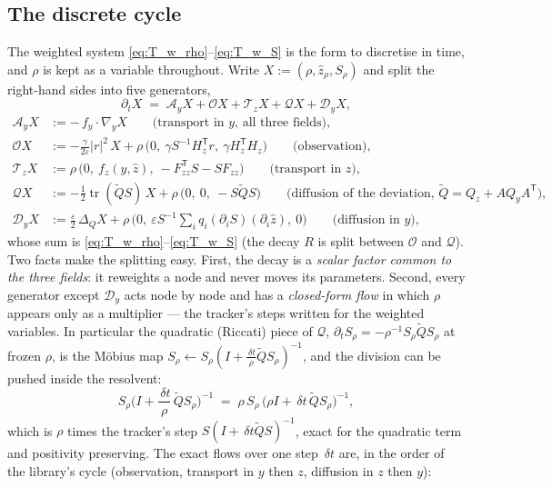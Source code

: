 \documentclass[11pt,a4paper]{article}
\newcommand{\tr}{\operatorname{tr}}
\newcommand{\T}{^{\mathsf T}}
\newcommand{\zh}{\hat{z}}
\newcommand{\zr}{\hat{z}_{\rho}}   %
\newcommand{\Sr}{S_{\rho}}          %
\newcommand{\eps}{\varepsilon}
\newcommand{\abs}[1]{\left\lvert #1 \right\rvert}
\newcommand{\gy}{\nabla_{\!y}}
\newcommand{\dt}{\,\delta t}
\theoremstyle{plain}
\theoremstyle{definition}
\theoremstyle{remark}
\begin{document}
\subsection{The discrete cycle}
\label{sec:cycle_main}

The weighted system \eqref{eq:T_w_rho}--\eqref{eq:T_w_S} is the form to discretise in time, and $\rho$ is kept as a variable throughout. Write $X := (\rho,\zr,\Sr)$ and split the right-hand sides into five generators,
\begin{equation}
  \partial_tX \;=\; \mathcal A_yX + \mathcal OX + \mathcal T_zX + \mathcal QX + \mathcal D_yX ,
  \label{eq:T_split}
\end{equation}
\begin{align*}
  \mathcal A_yX &:= -\,f_y\cdot\gy X \qquad\text{(transport in $y$, all three fields)},\\
  \mathcal OX &:= -\frac{\gamma}{2\eps}\abs r^2\,X + \rho\,\big(0,\ \gamma S^{-1}H_z\T r,\ \gamma H_z\T H_z\big) \qquad\text{(observation)},\\
  \mathcal T_zX &:= \rho\,\big(0,\ f_z(y,\zh),\ -F_{zz}\T S - SF_{zz}\big) \qquad\text{(transport in $z$)},\\
  \mathcal QX &:= -\frac12\tr(\tilde QS)\,X + \rho\,\big(0,\ 0,\ -S\tilde QS\big) \qquad\text{(diffusion of the deviation, $\tilde Q = Q_z + AQ_yA\T$)},\\
  \mathcal D_yX &:= \frac\eps2\,\Delta_QX + \rho\,\Big(0,\ \eps S^{-1}\!\sum_iq_i(\partial_iS)(\partial_i\zh),\ 0\Big) \qquad\text{(diffusion in $y$)},
\end{align*}
whose sum is \eqref{eq:T_w_rho}--\eqref{eq:T_w_S} (the decay $R$ is split between $\mathcal O$ and $\mathcal Q$). Two facts make the splitting easy. First, the decay is a \emph{scalar factor common to the three fields}: it reweights a node and never moves its parameters. Second, every generator except $\mathcal D_y$ acts node by node and has a \emph{closed-form flow} in which $\rho$ appears only as a multiplier --- the tracker's steps written for the weighted variables. In particular the quadratic (Riccati) piece of $\mathcal Q$, $\partial_t\Sr = -\rho^{-1}\Sr\tilde Q\Sr$ at frozen $\rho$, is the M\"obius map $\Sr\leftarrow\Sr(I+\tfrac{\dt}\rho\tilde Q\Sr)^{-1}$, and the division can be pushed inside the resolvent:
\begin{equation}
  \Sr\Big(I+\frac{\dt}{\rho}\,\tilde Q\Sr\Big)^{-1} \;=\; \rho\,\Sr\,\big(\rho I + \dt\,\tilde Q\Sr\big)^{-1},
  \label{eq:T_moebius}
\end{equation}
which is $\rho$ times the tracker's step $S(I+\dt\tilde QS)^{-1}$, exact for the quadratic term and positivity preserving. The exact flows over one step $\dt$ are, in the order of the library's cycle (observation, transport in $y$ then $z$, diffusion in $z$ then $y$):
\end{document}
